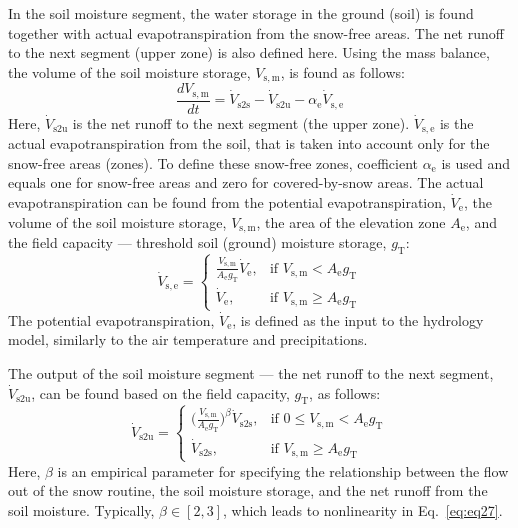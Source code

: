\documentclass[%
]{USN-PhD}
\begin{document}
In the soil moisture segment, the water storage in the ground (soil) is found together with actual evapotranspiration from the snow-free areas. The net runoff to the next segment (upper zone) is also defined here. Using the mass balance, the volume of the soil moisture storage, $V_\mathrm{s,m}$, is found as follows:
\begin{equation}\label{eq:eq25}
\frac{dV_\mathrm{s,m}}{dt}=\dot{V}_\mathrm{s2s}-\dot{V}_\mathrm{s2u}-\alpha_\mathrm{e}\dot{V}_\mathrm{s,e}
\end{equation}
Here, $\dot{V}_\mathrm{s2u}$ is the net runoff to the next segment (the upper zone). $\dot{V}_\mathrm{s,e}$ is the actual evapotranspiration from the soil, that is taken into account only for the snow-free areas (zones). To define these snow-free zones, coefficient $\alpha_\mathrm{e}$ is used and equals one for snow-free areas and zero for covered-by-snow areas. The actual evapotranspiration can be found from the potential evapotranspiration, $\dot{V}_\mathrm{e}$, the volume of the soil moisture storage, $V_\mathrm{s,m}$, the area of the elevation zone $A_\mathrm{e}$, and the field capacity --- threshold soil (ground) moisture storage, $g_\mathrm{T}$:
\begin{equation}\label{eq:eq26}
\dot{V}_\mathrm{s,e}=\begin{cases} \frac{V_\mathrm{s,m}}{A_\mathrm{e}g_\mathrm{T}}\dot{V}_\mathrm{e}, & \mbox{if } V_\mathrm{s,m}< A_\mathrm{e}g_\mathrm{T}\\ \dot{V}_\mathrm{e}, & \mbox{if } V_\mathrm{s,m}\geq A_\mathrm{e}g_\mathrm{T} \end{cases}
\end{equation}
The potential evapotranspiration, $\dot{V}_\mathrm{e}$, is defined as the input to the hydrology model, similarly to the air temperature and precipitations.

The output of the soil moisture segment --- the net runoff to the next segment, $\dot{V}_\mathrm{s2u}$, can be found based on the field capacity, $g_\mathrm{T}$, as follows:
\begin{equation}\label{eq:eq27}
\dot{V}_\mathrm{s2u}=\begin{cases} \Big(\frac{V_\mathrm{s,m}}{A_\mathrm{e}g_\mathrm{T}}\Big)^{\beta}\dot{V}_\mathrm{s2s}, & \mbox{if } 0\leq V_\mathrm{s,m}< A_\mathrm{e}g_\mathrm{T}\\ \dot{V}_\mathrm{s2s}, & \mbox{if } V_\mathrm{s,m}\geq A_\mathrm{e}g_\mathrm{T} \end{cases}
\end{equation}
Here, $\beta$ is an empirical parameter for specifying the relationship between the flow out of the snow routine, the soil moisture storage, and the net runoff from the soil moisture. Typically,  $\beta \in [2,3]$, which leads to nonlinearity in Eq.~\ref{eq:eq27}.
\end{document}
